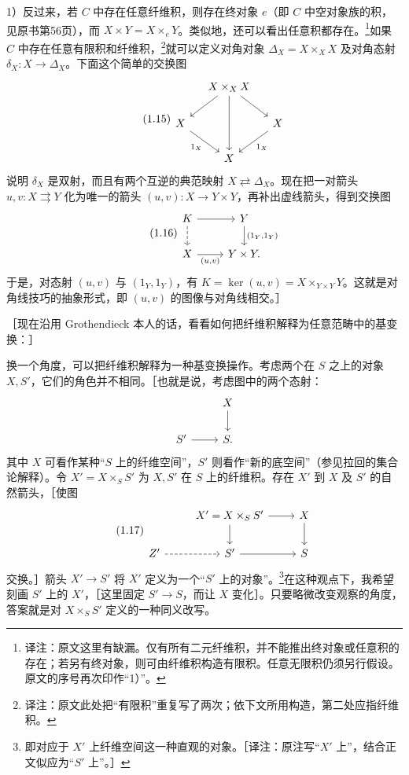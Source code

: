 1）反过来，若 $C$ 中存在任意纤维积，则存在终对象 $e$（即 $C$ 中空对象族的积，见原书第56页），而 $X\times Y=X\times_eY$。类似地，还可以看出任意积都存在。\footnote{译注：原文这里有缺漏。仅有所有二元纤维积，并不能推出终对象或任意积的存在；若另有终对象，则可由纤维积构造有限积。任意无限积仍须另行假设。原文的序号再次印作“1）”。}如果 $C$ 中存在任意有限积和纤维积，\footnote{译注：原文此处把“有限积”重复写了两次；依下文所用构造，第二处应指纤维积。}就可以定义对角对象 $\Delta_X=X\times_X X$ 及对角态射 $\delta_X:X\to\Delta_X$。下面这个简单的交换图
\begin{equation}\tag{1.15}
\begin{tikzcd}[column sep=small,ampersand replacement=\&]
 \&X\times_X X\arrow[dl]\arrow[dr]\arrow[dd]\&\\
 X\arrow[dr,"1_X"'] \&\&X\arrow[dl,"1_X"]\\ \&X\&
\end{tikzcd}
\end{equation}
说明 $\delta_X$ 是双射，而且有两个互逆的典范映射 $X\rightleftarrows\Delta_X$。现在把一对箭头 $u,v:X\rightrightarrows Y$ 化为唯一的箭头 $(u,v):X\to Y\times Y$，再补出虚线箭头，得到交换图
\begin{equation}\tag{1.16}
\begin{tikzcd}[ampersand replacement=\&]
 K\arrow[r]\arrow[d,dashed] \&Y\arrow[d,"{(1_Y,1_Y)}"]\\
 X\arrow[r,"{(u,v)}"'] \&Y\times Y.
\end{tikzcd}
\end{equation}
于是，对态射 $(u,v)$ 与 $(1_Y,1_Y)$，有 $K=\ker(u,v)=X\times_{Y\times Y}Y$。这就是对角线技巧的抽象形式，即 $(u,v)$ 的图像与对角线相交。］

［现在沿用 Grothendieck 本人的话，看看如何把纤维积解释为任意范畴中的基变换：］

换一个角度，可以把纤维积解释为一种基变换操作。考虑两个在 $S$ 之上的对象 $X,S'$，它们的角色并不相同。［也就是说，考虑图中的两个态射：
\[
\begin{tikzcd}[ampersand replacement=\&]
 \&X\arrow[d]\\S'\arrow[r]\&S.
\end{tikzcd}
\]
其中 $X$ 可看作某种“$S$ 上的纤维空间”，$S'$ 则看作“新的底空间”（参见拉回的集合论解释）。令 $X'=X\times_S S'$ 为 $X,S'$ 在 $S$ 上的纤维积。存在 $X'$ 到 $X$ 及 $S'$ 的自然箭头，［使图
\begin{equation}\tag{1.17}
\begin{tikzcd}[ampersand replacement=\&]
 \&X'=X\times_S S'\arrow[r]\arrow[d]\&X\arrow[d]\\
 Z'\arrow[r,dashed]\&S'\arrow[r]\&S
\end{tikzcd}
\end{equation}
交换。］箭头 $X'\to S'$ 将 $X'$ 定义为一个“$S'$ 上的对象”。\footnote{即对应于 $X'$ 上纤维空间这一种直观的对象。［译注：原注写“$X'$ 上”，结合正文似应为“$S'$ 上”。］}在这种观点下，我希望刻画 $S'$ 上的 $X'$，［这里固定 $S'\to S$，而让 $X$ 变化］。只要略微改变观察的角度，答案就是对 $X\times_S S'$ 定义的一种同义改写。

